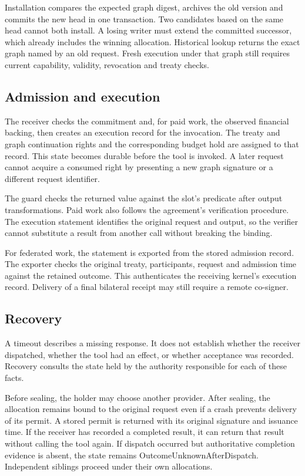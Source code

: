 Installation compares the expected graph digest, archives the old version and
commits the new head in one transaction. Two candidates based on the same head
cannot both install. A losing writer must extend the committed successor, which
already includes the winning allocation. Historical lookup returns the exact
graph named by an old request. Fresh execution under that graph still requires
current capability, validity, revocation and treaty checks.

\subsection{Admission and execution}
The receiver checks the commitment and, for paid work, the observed financial
backing, then creates an execution record for the invocation. The treaty and graph
continuation rights and the corresponding budget hold are assigned to that
record. This state becomes durable before the tool is invoked. A later request
cannot acquire a consumed right by presenting a new graph signature or a
different request identifier.

The guard checks the returned value against the slot's predicate after output
transformations. Paid work also follows the agreement's verification procedure.
The execution statement identifies the original request and output, so the
verifier cannot substitute a result from another call without breaking the
binding.

For federated work, the statement is exported from the stored admission record.
The exporter checks the original treaty, participants, request and admission
time against the retained outcome. This authenticates the receiving kernel's
execution record. Delivery of a final bilateral receipt may still require a
remote co-signer.

\subsection{Recovery}
A timeout describes a missing response. It does not establish whether the
receiver dispatched, whether the tool had an effect, or whether acceptance was
recorded. Recovery consults the state held by the authority responsible for
each of these facts.

Before sealing, the holder may choose another provider. After sealing, the
allocation remains bound to the original request even if a crash prevents
delivery of its permit. A stored permit is returned with its original signature
and issuance time. If the receiver has recorded a completed result, it can
return that result without calling the tool again. If dispatch occurred but
authoritative completion evidence is absent, the state remains
\textsf{OutcomeUnknownAfterDispatch}. Independent siblings proceed under their
own allocations.

